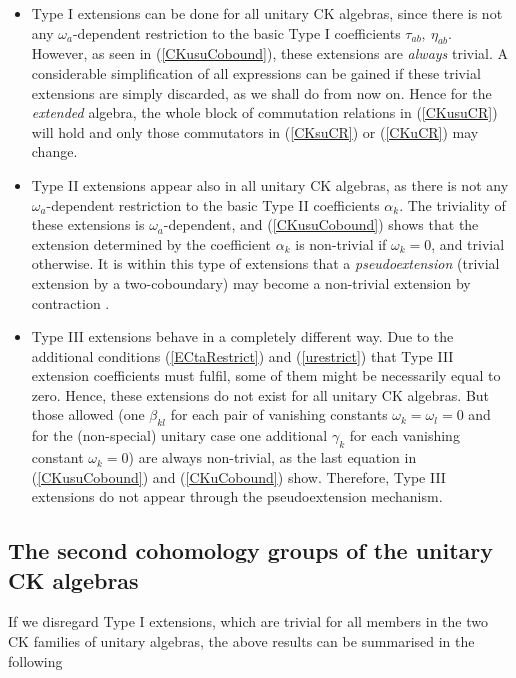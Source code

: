 \documentclass[12pt]{article}
\begin{document}
\begin{itemize}
\item
Type I extensions can be done for all  unitary CK
algebras, since there is not any ${\omega}_a$-dependent
restriction to the basic Type I coefficients
${\tau}_{ab},\ {\eta}_{ab}$. However, as seen in
(\ref{CKusuCobound}), these extensions are \emph{always} trivial. A
considerable simplification of all expressions can be gained
if these trivial extensions are simply discarded, as we shall
do from now on. Hence for the \emph{extended}
algebra, the whole block of commutation
relations in (\ref{CKusuCR}) will hold and only those commutators in
(\ref{CKsuCR}) or
(\ref{CKuCR}) may change.

\item
Type II extensions appear also in all  unitary CK
algebras, as there is not any ${\omega}_a$-dependent restriction to the
basic Type II coefficients
${\alpha}_{k}$. The triviality of these extensions is
${\omega}_a$-dependent, and (\ref{CKusuCobound}) shows that the extension
determined by the  coefficient ${\alpha}_{k}$ is
non-trivial if ${\omega}_{k} = 0$, and trivial otherwise. It is within
this type of extensions that a \emph{pseudoextension} (trivial
extension by a two-coboundary) may become a non-trivial extension
by contraction
\cite{Ald.Azc:85b,Azc.Izq:95}.

\item
Type III extensions behave in a completely different way.
Due to the additional conditions (\ref{ECtaRestrict}) and
(\ref{urestrict}) that Type III extension coefficients must fulfil, some
of them might be necessarily equal to zero. Hence, these extensions do not
exist for all  unitary CK algebras. But those allowed (one
${\beta}_{kl}$ for each pair of vanishing constants ${\omega}_k = {\omega}_l
=0$ and for the (non-special)  unitary case one additional ${\gamma}_{k}$
for each vanishing constant ${\omega}_k =0$) are
always non-trivial, as the last equation in (\ref{CKusuCobound}) and
(\ref{CKuCobound}) show. Therefore, Type III extensions  do
not appear through the pseudoextension mechanism.
\end{itemize}

\subsection{The second cohomology groups of the unitary CK algebras}
\label{sec4}

If we disregard Type I extensions, which are trivial for all members in
the two CK families of  unitary algebras, the above  results can be
summarised in the following
\end{document}
